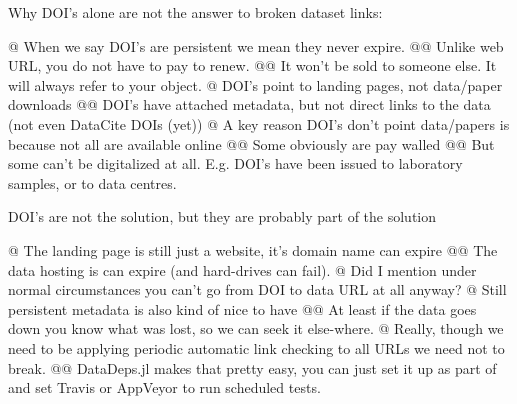\documentclass[dvipsnames]{beamer}
\newcommand{\inlinecode}[1]{\mbox{\color{Purple}{\texttt{\detokenize{#1}}}}}
\begin{document}
\begin{frame}[fragile]{Why DOI's alone are not the answer to broken dataset links:}
	\small
	\begin{easylist}[itemize]
		@ When we say DOI's are persistent we mean they never expire.
		@@ Unlike web URL, you do not have to pay to renew.
		@@ It won't be sold to someone else. It will always refer to your object.
		@ DOI's point to landing pages, not data/paper downloads
		@@ DOI's have attached metadata, but not direct links to the data (not even DataCite DOIs (yet))
		@ A key reason DOI's don't point data/papers is because not all are available online
		@@ Some obviously are pay walled
		@@ But some can't be digitalized at all. E.g. DOI's have been issued to laboratory samples, or to data centres.		
	\end{easylist}
\end{frame}
\begin{frame}[fragile]{DOI's are not the solution, but they are probably part of the solution}
	\begin{easylist}[itemize]
		@ The landing page is still just a website, it's domain name \alert{can expire}
		@@ The data hosting is can expire (and hard-drives can fail).
		@ Did I mention under normal circumstances you can't go from DOI to data URL at all anyway?
		@ Still persistent metadata is also kind of nice to have
		@@ At least if the data goes down you know what was lost, so we can seek it else-where.
		@ Really, though we need to be applying periodic automatic link checking to all URLs we need not to break.
		@@ DataDeps.jl makes that pretty easy, you can just set it up as part of \inlinecode{runtests.jl} and set Travis or AppVeyor to run scheduled tests.
	\end{easylist}
\end{frame}
\end{document}
